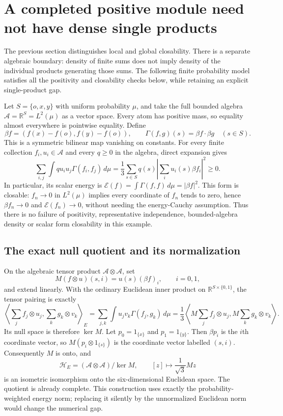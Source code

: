 \documentclass[11pt]{article}
\newcommand{\R}{\mathbb R}\newcommand{\C}{\mathbb C}
\begin{document}
\section{A completed positive module need not have dense single products}
The previous section distinguishes local and global closability. There
is a separate algebraic boundary: density of finite sums does not imply
density of the individual products generating those sums. The following
finite probability model satisfies all the positivity and closability
checks below, while retaining an explicit single-product gap.

Let $S=\{o,x,y\}$ with uniform probability $\mu$, and take the full
bounded algebra $\mathcal A=\R^S=L^2(\mu)$ as a vector space. Every
atom has positive mass, so equality almost everywhere is pointwise
equality. Define
\[
 \beta f=(f(x)-f(o),f(y)-f(o)),\qquad
 \Gamma(f,g)(s)=\beta f\cdot\beta g\quad(s\in S).
\]
This is a symmetric bilinear map vanishing on constants. For every
finite collection $f_i,u_i\in\mathcal A$ and every $q\geq0$ in the
algebra, direct expansion gives
\[
 \sum_{i,j}\int q u_i u_j\Gamma(f_i,f_j)\,d\mu
 =\frac13\sum_{s\in S}q(s)
       \left|\sum_i u_i(s)\beta f_i\right|^2\geq0.                 \tag{*}
\]
In particular, its scalar energy is
$\mathcal E(f)=\int\Gamma(f,f)\,d\mu=|\beta f|^2$.
This form is closable: $f_n\to0$ in $L^2(\mu)$ implies every coordinate
of $f_n$ tends to zero, hence $\beta f_n\to0$ and
$\mathcal E(f_n)\to0$, without needing the energy-Cauchy assumption.
Thus there is no failure of positivity, representative independence,
bounded-algebra density or scalar form closability in this example.

\subsection*{The exact null quotient and its normalization}
On the algebraic tensor product $\mathcal A\otimes\mathcal A$, set
\[
 M(f\otimes u)(s,i)=u(s)(\beta f)_i,\qquad i=0,1,
\]
and extend linearly. With the ordinary Euclidean inner product on
$\R^{S\times\{0,1\}}$, the tensor pairing is exactly
\[
 \left\langle\sum_j f_j\otimes u_j,\sum_k g_k\otimes v_k\right\rangle_E
 =\sum_{j,k}\int u_jv_k\Gamma(f_j,g_k)\,d\mu
 =\frac13\left\langle M\sum_j f_j\otimes u_j,
                         M\sum_k g_k\otimes v_k\right\rangle.
\]
Its null space is therefore $\ker M$. Let $p_0=1_{\{x\}}$ and
$p_1=1_{\{y\}}$. Then $\beta p_i$ is the $i$th coordinate vector,
so $M(p_i\otimes1_{\{s\}})$ is the coordinate vector labelled
$(s,i)$. Consequently $M$ is onto, and
\[
 \mathcal H_E=(\mathcal A\otimes\mathcal A)/\ker M,
 \qquad [z]\longmapsto\frac1{\sqrt3}Mz
\]
is an isometric isomorphism onto the six-dimensional Euclidean space.
The quotient is already complete. This construction uses exactly the
probability-weighted energy norm; replacing it silently by the
unnormalized Euclidean norm would change the numerical gap.
\end{document}
